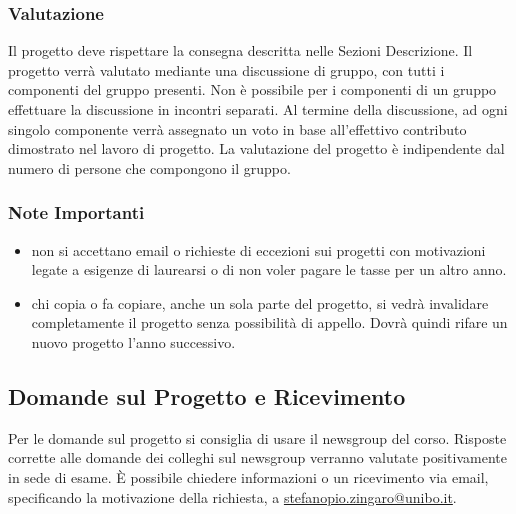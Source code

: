 \documentclass{article}
\begin{document}
\subsubsection{Valutazione}
%
Il progetto deve rispettare la consegna descritta nelle Sezioni Descrizione. 
Il progetto verrà valutato mediante una discussione di gruppo, con tutti i componenti del gruppo presenti. 
Non è possibile per i componenti di un gruppo effettuare la discussione in incontri separati. 
Al termine della discussione, ad ogni singolo componente verrà assegnato un voto in base all'effettivo contributo dimostrato nel lavoro di progetto. 
La valutazione del progetto è indipendente dal numero di persone che compongono il gruppo.
\subsubsection{Note Importanti}
%
\begin{itemize}
    \item non si accettano email o richieste di eccezioni sui progetti con motivazioni legate a esigenze di laurearsi o di non voler pagare le tasse per un altro anno.
    \item chi copia o fa copiare, anche un sola parte del progetto, si vedrà invalidare completamente il progetto senza possibilità di appello. Dovrà quindi rifare un nuovo progetto l'anno successivo.
\end{itemize}
%
\subsection{Domande sul Progetto e Ricevimento}
%
Per le domande sul progetto si consiglia di usare il newsgroup del corso. 
Risposte corrette alle domande dei colleghi sul newsgroup verranno valutate positivamente in sede di esame. 
È possibile chiedere informazioni o un ricevimento via email, specificando la motivazione della richiesta, a \url{stefanopio.zingaro@unibo.it}.
%
\end{document}
